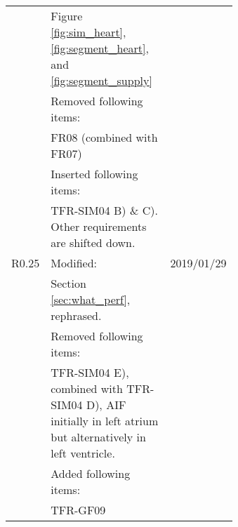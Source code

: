 \begin{table} [h]
\begin{tabular}{|c|p{0.64\linewidth}|l|}
		 	& \textbullet Figure \ref{fig:sim_heart}, \ref{fig:segment_heart}, and \ref{fig:segment_supply} & \\
		 	& Removed following items: & \\
		 	& \textbullet FR08 (combined with FR07) & \\
		 	& Inserted following items: & \\
		 	& \textbullet TFR-SIM04 B) \& C). Other requirements are shifted down. & \\
		 	R0.25 & Modified: & 2019/01/29 \\
		 	& \textbullet Section \ref{sec:what_perf}, rephrased. & \\
		 	& Removed following items: & \\
		 	& \textbullet TFR-SIM04 E), combined with TFR-SIM04 D), AIF initially in left atrium but alternatively in left ventricle. & \\
		 	& Added following items: & \\
		 	& \textbullet TFR-GF09 & \\
		\hline
	\end{tabular}
\end{table}

\newpage

